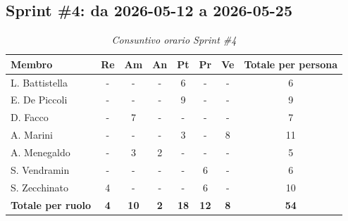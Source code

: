﻿\documentclass[a4paper, 10pt, colorlinks=true, linkcolor=black, urlcolor=blue, citecolor=blue, hidelinks]{article}
\renewcommand{\arraystretch}{1.2}
\begin{document}
\subsection{Sprint \#4: da 2026-05-12 a 2026-05-25}

\begin{table}[H]
    \centering
    \renewcommand{\arraystretch}{1.4}
    \begin{tabular}{|l|c|c|c|c|c|c|c|}
        \hline
        \rowcolor{bluBitless!15}
        \textbf{Membro} & \textbf{Re} & \textbf{Am} & \textbf{An} & \textbf{Pt} & \textbf{Pr} & \textbf{Ve} & \textbf{Totale per persona} \\
        \hline
        L. Battistella & - & - & - & 6 & - & - & 6 \\ \hline
        E. De Piccoli & - & - & - & 9 & - & - & 9 \\ \hline
        D. Facco & - & 7 & - & - & - & - & 7 \\ \hline
        A. Marini & - & - & - & 3 & - & 8 & 11 \\ \hline
        A. Menegaldo & - & 3 & 2 & - & - & - & 5 \\ \hline
        S. Vendramin & - & - & - & - & 6 & - & 6 \\ \hline
        S. Zecchinato & 4 & - & - & - & 6 & - & 10 \\ \hline
        \rowcolor{bluBitless!8}
        \textbf{Totale per ruolo} & \textbf{4} & \textbf{10} & \textbf{2} & \textbf{18} & \textbf{12} & \textbf{8} & \textbf{54} \\
        \hline
    \end{tabular}
    \caption{\textit{Consuntivo orario Sprint \#4}}
\end{table}
\end{document}
